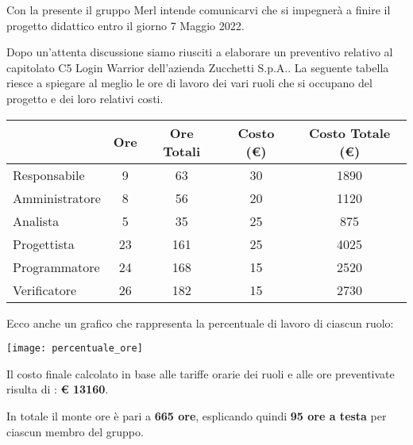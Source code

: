 Con la presente il gruppo Merl intende comunicarvi che si impegnerà a finire il progetto didattico entro il giorno 7 Maggio 2022.

Dopo un’attenta discussione siamo riusciti a elaborare un preventivo relativo al capitolato C5 Login Warrior dell’azienda Zucchetti S.p.A.. La seguente tabella riesce a spiegare al meglio le ore di lavoro dei vari ruoli che si occupano del progetto e dei loro relativi costi.

\begin{center}
  \begin{tabular}{ |l|c|c|c|c| }
    \hline
                   & Ore & Ore Totali & Costo (€) & Costo Totale (€) \\
    \hline
    Responsabile   & 9   & 63         & 30        & 1890             \\
    \hline
    Amministratore & 8   & 56         & 20        & 1120             \\
    \hline
    Analista       & 5   & 35         & 25        & 875              \\
    \hline
    Progettista    & 23  & 161        & 25        & 4025             \\
    \hline
    Programmatore  & 24  & 168        & 15        & 2520             \\
    \hline
    Verificatore   & 26  & 182        & 15        & 2730             \\
    \hline
  \end{tabular}
\end{center}

Ecco anche un grafico che rappresenta la percentuale di lavoro di ciascun ruolo:
\begin{center}
  \texttt{[image: percentuale\_ore]}
\end{center}

Il costo finale calcolato in base alle tariffe orarie dei ruoli e alle ore preventivate risulta di :
\textbf{€ 13160}.

In totale il monte ore è pari a \textbf{665 ore}, esplicando quindi \textbf{95 ore a testa} per ciascun membro del gruppo.
